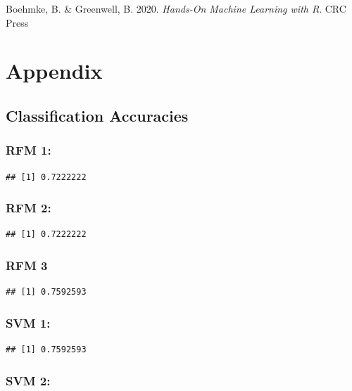 \documentclass[11pt,preprint, authoryear]{elsarticle}
\numberwithin{equation}{section}
\numberwithin{figure}{section}
\numberwithin{table}{section}
\begin{document}
Boehmke, B. \& Greenwell, B. 2020. \emph{Hands-On Machine Learning with
R}. CRC Press

\newpage

\hypertarget{appendix}{%
\section{Appendix}\label{appendix}}

\hypertarget{classification-accuracies}{%
\subsection{Classification Accuracies}\label{classification-accuracies}}

\hypertarget{rfm-1}{%
\subsubsection{RFM 1:}\label{rfm-1}}

\begin{verbatim}
## [1] 0.7222222
\end{verbatim}

\hypertarget{rfm-2}{%
\subsubsection{RFM 2:}\label{rfm-2}}

\begin{verbatim}
## [1] 0.7222222
\end{verbatim}

\hypertarget{rfm-3}{%
\subsubsection{RFM 3}\label{rfm-3}}

\begin{verbatim}
## [1] 0.7592593
\end{verbatim}

\hypertarget{svm-1}{%
\subsubsection{SVM 1:}\label{svm-1}}

\begin{verbatim}
## [1] 0.7592593
\end{verbatim}

\hypertarget{svm-2}{%
\subsubsection{SVM 2:}\label{svm-2}}
\end{document}
